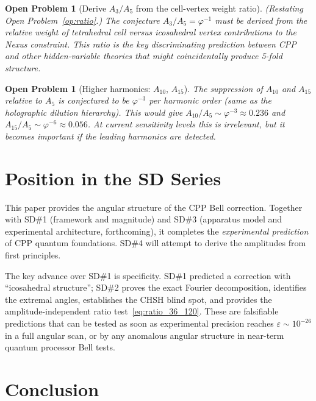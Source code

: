 \documentclass[11pt,a4paper]{article}
\newtheorem{openprob}[theorem]{Open Problem}
\newcommand{\phig}{\varphi}
\newcommand{\eps}{\varepsilon}
\begin{document}
\begin{openprob}[Derive $A_3/A_5$ from the cell-vertex weight ratio]
(Restating Open Problem~\ref{op:ratio}.)
The conjecture $A_3/A_5 = \phig^{-1}$ must be derived from
the relative weight of tetrahedral cell versus icosahedral vertex
contributions to the Nexus constraint.  This ratio is the key
discriminating prediction between CPP and other hidden-variable
theories that might coincidentally produce 5-fold structure.
\end{openprob}

\begin{openprob}[Higher harmonics: $A_{10}$, $A_{15}$]
The suppression of $A_{10}$ and $A_{15}$ relative to $A_5$ is
conjectured to be $\phig^{-3}$ per harmonic order (same as the
holographic dilution hierarchy).  This would give $A_{10}/A_5 \sim
\phig^{-3} \approx 0.236$ and $A_{15}/A_5 \sim \phig^{-6} \approx
0.056$.  At current sensitivity levels this is irrelevant, but it
becomes important if the leading harmonics are detected.
\end{openprob}

\section{Position in the SD Series}

This paper provides the angular structure of the CPP Bell correction.
Together with SD\#1 (framework and magnitude) and SD\#3 (apparatus
model and experimental architecture, forthcoming), it completes the
\emph{experimental prediction} of CPP quantum foundations.  SD\#4
will attempt to derive the amplitudes from first principles.

The key advance over SD\#1 is specificity.  SD\#1 predicted a
correction with ``icosahedral structure''; SD\#2 proves the exact
Fourier decomposition, identifies the extremal angles, establishes
the CHSH blind spot, and provides the amplitude-independent ratio
test~\eqref{eq:ratio_36_120}.  These are falsifiable predictions
that can be tested as soon as experimental precision reaches
$\eps \sim 10^{-26}$ in a full angular scan, or by any anomalous
angular structure in near-term quantum processor Bell tests.

\section{Conclusion}
\end{document}
